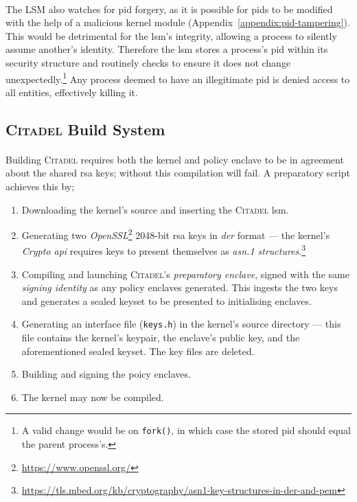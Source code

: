 \paragraph{} The LSM also watches for \acrshort{pid} forgery, as it is possible for \acrshort{pid}s to be modified with the help of a malicious kernel module (Appendix~\ref{appendix:pid-tampering}). This would be detrimental for the \acrshort{lsm}'s integrity, allowing a process to silently assume another's identity. Therefore the \acrshort{lsm} stores a process's \acrshort{pid} within its security structure and routinely checks to ensure it does not change unexpectedly.\footnote{A valid change would be on \texttt{fork()}, in which case the stored \acrshort{pid} should equal the parent process's.} Any process deemed to have an illegitimate \acrshort{pid} is denied access to all entities, effectively killing it.

\subsection{\textsc{Citadel} Build System}
\label{sec:build-system}
\paragraph{} Building \textsc{Citadel} requires both the kernel and policy enclave to be in agreement about the shared \acrshort{rsa} keys; without this compilation will fail. A preparatory script achieves this by;

\begin{enumerate}
    \item Downloading the kernel's source and inserting the \textsc{Citadel} \acrshort{lsm}.
    \item Generating two \textit{OpenSSL}\footnote{\url{https://www.openssl.org/}} 2048-bit \acrshort{rsa} keys in \textit{\acrshort{der}} format --- the kernel's \textit{Crypto \acrshort{api}} requires keys to present themselves as \textit{\acrshort{asn}.1 structures}.\footnote{\url{https://tls.mbed.org/kb/cryptography/asn1-key-structures-in-der-and-pem}}
    \item Compiling and launching \textsc{Citadel}'s \textit{preparatory enclave}, signed with the same \textit{signing identity} as any policy enclaves generated. This ingests the two keys and generates a sealed keyset to be presented to initialising enclaves.
    \item Generating an interface file (\texttt{keys.h}) in the kernel's source directory --- this file contains the kernel's keypair, the enclave's public key, and the aforementioned sealed keyset. The key files are deleted.
    \item Building and signing the poicy enclaves.
    \item The kernel may now be compiled.
\end{enumerate}
